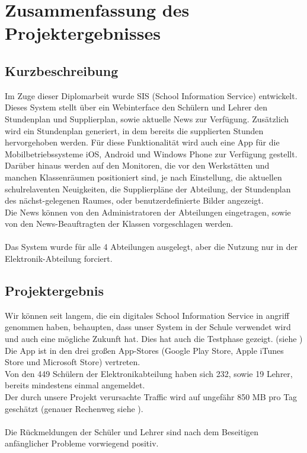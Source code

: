 \chapter[Zusammenfassung]{Zusammenfassung des Projektergebnisses}

\section{Kurzbeschreibung}
Im Zuge dieser Diplomarbeit wurde SIS (School Information Service) entwickelt. \\
Dieses System stellt über ein Webinterface den Schülern und Lehrer den Stundenplan und Supplierplan, sowie aktuelle News zur Verfügung. Zusätzlich wird ein Stundenplan generiert, in dem bereits die supplierten Stunden hervorgehoben werden.
Für diese Funktionalität wird auch eine App für die Mobilbetriebssysteme iOS, Android und Windows Phone zur Verfügung gestellt.\\
Darüber hinaus werden auf den Monitoren, die vor den Werkstätten und manchen Klassenräumen positioniert sind, je nach Einstellung, die aktuellen schulrelaventen Neuigkeiten, die Supplierpläne der Abteilung, der Stundenplan des nächst-gelegenen Raumes, oder benutzerdefinierte Bilder angezeigt.\\
Die News können von den Administratoren der Abteilungen eingetragen, sowie von den News-Beauftragten der Klassen vorgeschlagen werden.\\
\\
Das System wurde für alle 4 Abteilungen ausgelegt, aber die Nutzung nur in der Elektronik-Abteilung forciert.

\section{Projektergebnis}
Wir können seit langem, die ein digitales School Information Service in angriff genommen haben, behaupten, dass unser System in der Schule verwendet wird und auch eine mögliche Zukunft hat. Dies hat auch die Testphase gezeigt. (siehe )\\
Die App ist in den drei großen App-Stores (Google Play Store, Apple iTunes Store und Microsoft Store) vertreten.\\
Von den 449 Schülern der Elektronikabteilung haben sich 232, sowie 19 Lehrer, bereits mindestens einmal angemeldet. \\
Der durch unsere Projekt verursachte Traffic wird auf ungefähr 850 MB pro Tag geschätzt (genauer Rechenweg siehe ).\\
\\
Die Rückmeldungen der Schüler und Lehrer sind nach dem Beseitigen anfänglicher Probleme vorwiegend positiv.